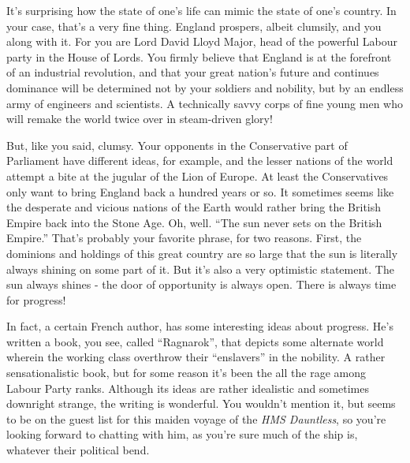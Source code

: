 \documentclass[char]{airship}
\begin{document}
\name{\cNoble{}}

    
It's surprising how the state of one's life can mimic the state of
one's country. In your case, that's a very fine thing. England
prospers, albeit clumsily, and you along with it. For you are Lord
David Lloyd Major, head of the powerful Labour party in the House of
Lords. You firmly believe that England is at the forefront of an
industrial revolution, and that your great nation's future and
continues dominance will be determined not by your soldiers and
nobility, but by an endless army of engineers and scientists. A
technically savvy corps of fine young men who will remake the world
twice over in steam-driven glory!

But, like you said, clumsy. Your opponents in the Conservative part of
Parliament have different ideas, for example, and the lesser nations
of the world attempt a bite at the jugular of the Lion of Europe. At
least the Conservatives only want to bring England back a hundred
years or so. It sometimes seems like the desperate and vicious nations
of the Earth would rather bring the British Empire back into the Stone
Age. Oh, well. ``The sun never sets on the British Empire.'' That's
probably your favorite phrase, for two reasons. First, the dominions
and holdings of this great country are so large that the sun is
literally always shining on some part of it. But it's also a very
optimistic statement. The sun always shines - the door of opportunity
is always open. There is always time for progress!

In fact, a certain French author, \cSaboteur{} has some interesting ideas about progress. He's written a book, you see, called ``Ragnarok'', that depicts some alternate world wherein the working class overthrow their ``enslavers'' in the nobility. A rather sensationalistic book, but for some reason it's been the all the rage among Labour Party ranks. Although its ideas are rather idealistic and sometimes downright strange, the writing is wonderful. You wouldn't mention it, but \cSaboteur{} seems to be on the guest list for this maiden voyage of the {\em HMS Dauntless}, so you're looking forward to chatting with him, as you're sure much of the ship is, whatever their political bend.
\end{document}
